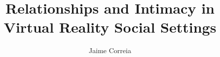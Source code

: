 \documentclass[acmlarge]{acmart}
\begin{document}
\title{Relationships and Intimacy in Virtual Reality Social Settings}

\author{Jaime Correia}
\renewcommand{\shortauthors}{Correia}

\begin{abstract}
  
  \label{section::abstract}
\end{abstract}

\maketitle




\end{document}
